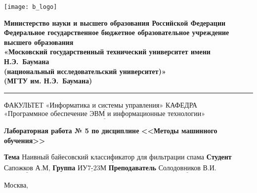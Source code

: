 \thispagestyle{empty}

\noindent \begin{minipage}{0.15\textwidth}
	\texttt{[image: b\_logo]}
\end{minipage}
\noindent\begin{minipage}{0.85\textwidth}\centering
	\textbf{Министерство науки и высшего образования Российской Федерации}\\
	\textbf{Федеральное государственное бюджетное образовательное учреждение высшего образования}\\
	\textbf{«Московский государственный технический университет имени Н.Э.~Баумана}\\
	\textbf{(национальный исследовательский университет)»}\\
	\textbf{(МГТУ им. Н.Э.~Баумана)}
\end{minipage}

\noindent\rule{\linewidth}{3pt}
\newline\newline
\noindent ФАКУЛЬТЕТ $\underline{\text{«Информатика и системы управления»}}$ \newline\newline
\noindent КАФЕДРА $\underline{\text{«Программное обеспечение ЭВМ и информационные технологии»}}$

\vspace{1cm}

\begin{center}
	\noindent\begin{minipage}{1.3\textwidth}\centering
		\Large\textbf{  Лабораторная работа № 5 по дисциплине}\newline
		\textbf{<<Методы машинного обучения>>}\newline
	\end{minipage}
\end{center}

\noindent\textbf{Тема} $\underline{\text{Наивный байесовский классификатор для фильтрации спама}}$\newline\newline
\noindent\textbf{Студент} $\underline{\text{Сапожков А.М,}}$\newline\newline
\noindent\textbf{Группа} $\underline{\text{ИУ7-23М}}$\newline\newline
\noindent\textbf{Преподаватель} $\underline{\text{Солодовников В.И.}}$\newline

\begin{center}
	\vfill
	Москва,~\the\year
\end{center}
\clearpage
